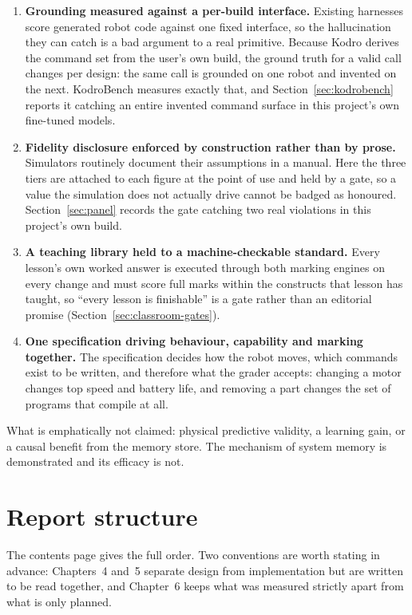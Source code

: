 \documentclass[11pt,a4paper]{report}
\begin{document}
\begin{enumerate}[label=N\arabic*.,leftmargin=*,itemsep=1pt]
\item {} \textbf{Grounding measured against a per-build interface.} Existing harnesses score generated robot code against one fixed interface, so the hallucination they can catch is a bad argument to a real primitive. Because Kodro derives the command set from the user's own build, the ground truth for a valid call changes per design: the same call is grounded on one robot and invented on the next. KodroBench measures exactly that, and Section~\ref{sec:kodrobench} reports it catching an entire invented command surface in this project's own fine-tuned models.
\item {} \textbf{Fidelity disclosure enforced by construction rather than by prose.} Simulators routinely document their assumptions in a manual. Here the three tiers are attached to each figure at the point of use and held by a gate, so a value the simulation does not actually drive cannot be badged as honoured. Section~\ref{sec:panel} records the gate catching two real violations in this project's own build.
\item {} \textbf{A teaching library held to a machine-checkable standard.} Every lesson's own worked answer is executed through both marking engines on every change and must score full marks within the constructs that lesson has taught, so ``every lesson is finishable'' is a gate rather than an editorial promise (Section~\ref{sec:classroom-gates}).
\item {} \textbf{One specification driving behaviour, capability and marking together.} The specification decides how the robot moves, which commands exist to be written, and therefore what the grader accepts: changing a motor changes top speed and battery life, and removing a part changes the set of programs that compile at all.
\end{enumerate}

What is emphatically not claimed: physical predictive validity, a learning gain, or a causal benefit from the memory store. The mechanism of system memory is demonstrated and its efficacy is not.

\section{Report structure}
The contents page gives the full order. Two conventions are worth stating in advance: Chapters~4 and~5 separate design from implementation but are written to be read together, and Chapter~6 keeps what was measured strictly apart from what is only planned.
\end{document}
